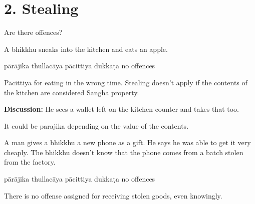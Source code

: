 \chapter{2. Stealing}
\renewcommand*{\theChapterTitle}{2. Stealing}

\begin{exam}{\autoExamName}

\begin{problem*}

  Are there offences?

\begin{parts}

  \item A bhikkhu sneaks into the kitchen and eats an apple.

  \bigskip

  \begin{answers}{5}
    \bChoices
     pārājika\eAns
     thullacāya\eAns
     pācittiya\eAns
     dukkaṭa\eAns
     no offences\eAns
    \eChoices
  \end{answers}

  \bigskip

  \begin{solution}
    Pācittiya for eating in the wrong time. Stealing doesn't apply if the
    contents of the kitchen are considered Sangha property.
  \end{solution}

  \textbf{Discussion:} He sees a wallet left on the kitchen counter and takes that too.

  \begin{solution}
    It could be parajika depending on the value of the contents.
  \end{solution}

  \bigskip

  \item A man gives a bhikkhu a new phone as a gift. He says he was able to get it very cheaply.
  The bhikkhu doesn't know that the phone comes from a batch stolen from the factory. 

  \bigskip

  \begin{answers}{5}
    \bChoices
     pārājika\eAns
     thullacāya\eAns
     pācittiya\eAns
     dukkaṭa\eAns
     no offences\eAns
    \eChoices
  \end{answers}

  \begin{solution}
    There is no offense assigned for receiving stolen goods, even knowingly.
  \end{solution}


\end{parts}
\end{problem*}
\end{exam}
